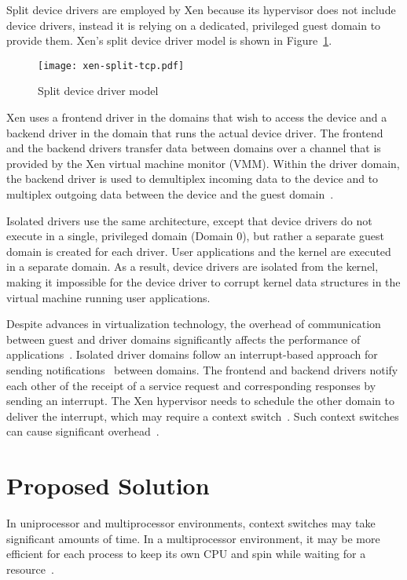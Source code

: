 Split device drivers are employed by Xen because its hypervisor
does not include device drivers,
instead it is relying on a dedicated, privileged guest domain to provide them.
Xen's split device driver model is shown in Figure~\ref{fig:xen-split}.
\begin{figure}[!ht]
\centering
\texttt{[image: xen-split-tcp.pdf]}
\caption{Split device driver model}
\label{fig:xen-split}
\end{figure}
Xen uses a frontend driver in the domains that wish to access the device
and a backend driver in the domain that runs the actual device driver. The
frontend and the backend drivers transfer data between domains over
a channel that is provided by the Xen virtual machine monitor (VMM).
Within the driver domain, the backend driver is used to demultiplex
incoming data to the device and to multiplex outgoing data between the
device and the guest domain~\cite{driverdomain}.

Isolated drivers use the same architecture, except that device drivers
do not execute in a single, privileged domain (Domain 0), but rather
a separate guest domain is created for each driver.
User applications and the kernel are executed in a separate domain.
As a result, device drivers are isolated from the 
kernel, making it impossible for the device driver to corrupt kernel
data structures in the virtual machine running user applications.

Despite advances in virtualization technology, the overhead of
communication between guest and driver domains significantly
affects the performance of applications~\cite{barham2003xen,
Sugerman:2001:VID:647055.715774, Menon:2006:ONV:1267359.1267361}. Isolated
driver domains follow an interrupt-based approach for sending
notifications~\cite{barham2003xen} between domains. The frontend and backend 
drivers notify each other of the receipt of a service request and corresponding responses
by sending an interrupt. The Xen hypervisor needs to schedule the
other domain to deliver the interrupt, which may require a context
switch~\cite{barham2003xen}. Such context switches can cause significant
overhead~\cite{Li:2007:QCC:1281700.1281702, Mogul:1991:ECS:106973.106982}.

\section {Proposed Solution}
\label{sec:solution}
In uniprocessor and multiprocessor environments, context switches may take
significant amounts of time. In a multiprocessor environment, it may be more
efficient for each process to keep its own CPU and spin while waiting
for a resource~\cite{Bovet:2005:ULK:1077084}. 

